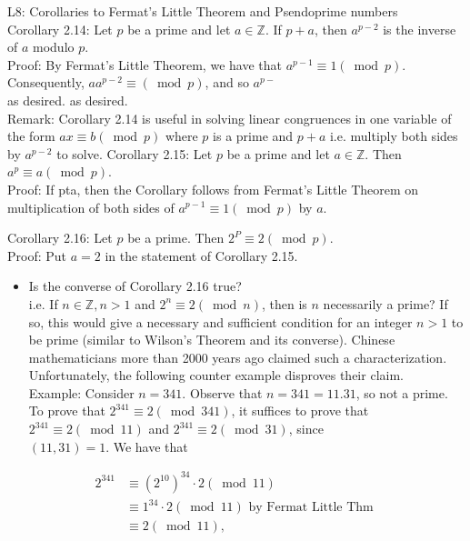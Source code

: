 \documentclass[10pt]{article}
\begin{document}
L8: Corollaries to Fermat's Little Theorem and Psendoprime numbers\\
Corollary 2.14: Let $p$ be a prime and let $a \in \mathbb{Z}$. If $p+a$, then $a^{p-2}$ is the inverse of $a$ modulo $p$.\\
Proof: By Fermat's Little Theorem, we have that $a^{p-1} \equiv 1(\bmod p)$. Consequently, $a a^{p-2} \equiv(\bmod p)$, and so $a^{p-}$\\
as desired. as desired.\\
Remark: Corollary 2.14 is useful in solving linear congruences in one variable of the form $a x \equiv b(\bmod p)$ where $p$ is a prime and $p+a$ i.e. multiply both sides by $a^{p-2}$ to solve. Corollary 2.15: Let $p$ be a prime and let $a \in \mathbb{Z}$. Then $a^{p} \equiv a(\bmod p)$.\\
Proof: If pta, then the Corollary follows from Fermat's Little Theorem on multiplication of both sides of $a^{p-1} \equiv 1(\bmod p)$ by $a$.

Corollary 2.16: Let $p$ be a prime. Then $2^{P} \equiv 2(\bmod p)$.\\
Proof: Put $a=2$ in the statement of Corollary 2.15.

\begin{itemize}
  \item Is the converse of Corollary 2.16 true?\\
i.e. If $n \in \mathbb{Z}, n>1$ and $2^{n} \equiv 2(\bmod n)$, then is $n$ necessarily a prime? If so, this would give a necessary and sufficient condition for an integer $n>1$ to be prime (similar to Wilson's Theorem and its converse). Chinese mathematicians more than 2000 years ago claimed such a characterization. Unfortunately, the following counter example disproves their claim.\\
Example: Consider $n=341$. Observe that $n=341 =11.31$, so not a prime. To prove that $2^{341} \equiv 2(\bmod 341)$, it suffices to prove that $2^{341} \equiv 2(\bmod 11)$ and $2^{341} \equiv 2(\bmod 31)$, since\\
$(11,31)=1$. We have that
\end{itemize}

$$
\begin{aligned}
2^{341} & \equiv\left(2^{10}\right)^{34} \cdot 2(\bmod 11) \\
& \equiv 1^{34} \cdot 2(\bmod 11) \text { by Fermat Little Thm } \\
& \equiv 2(\bmod 11),
\end{aligned}
$$
\end{document}
